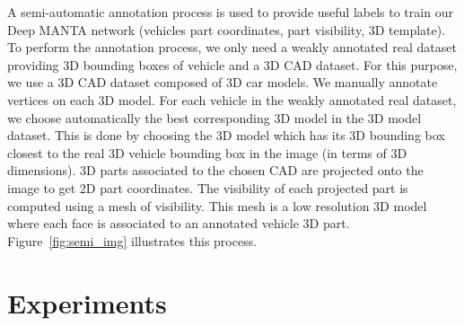 \documentclass[10pt,twocolumn,letterpaper]{article}
\begin{document}
A semi-automatic annotation process is used to provide useful labels to train our Deep MANTA network (vehicles part coordinates, part visibility, 3D template). To perform the annotation process, we only need a weakly annotated real dataset providing 3D bounding boxes of vehicle and a 3D CAD dataset. For this purpose, we use a 3D CAD dataset composed of  3D car models. We manually annotate  vertices on each 3D model. For each vehicle in the weakly annotated real dataset, we choose automatically the best corresponding 3D model in the 3D model dataset. This is done by choosing the 3D model which has its 3D bounding box closest to the real 3D vehicle bounding box in the image (in terms of 3D dimensions). 3D parts associated to the chosen CAD are projected onto the image to get 2D part coordinates. The visibility of each projected part is computed using a mesh of visibility. This mesh is a low resolution 3D model where each face is associated to an annotated vehicle 3D part. Figure~\ref{fig:semi_img} illustrates this process.











\section{Experiments}
\label{sec:experiments}
\end{document}
